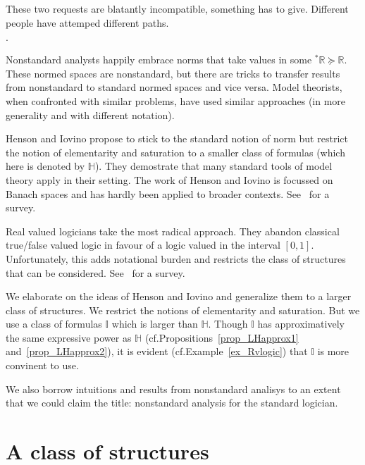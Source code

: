 \documentclass[10pt,oneside]{amsproc}
\newcommand{\mylabel}[1]{{#1}\hfill}
\renewenvironment{itemize}
  {\begin{list}{$\cdot$}{%
  \setlength{\parskip}{0mm}
  \setlength{\topsep}{.2\baselineskip}
  \setlength{\rightmargin}{0mm}
  \setlength{\listparindent}{0mm}
  \setlength{\itemindent}{0mm}
  \setlength{\labelwidth}{3ex}
  \setlength{\itemsep}{.2\baselineskip}
  \setlength{\parsep}{.2\baselineskip}
  \setlength{\partopsep}{0mm}
  \setlength{\labelsep}{1ex}
  \setlength{\leftmargin}{\labelwidth+\labelsep}
  \let\makelabel\mylabel}}{%
\end{list}}
\begin{document}
These two requests are blatantly incompatible, something has to give.
Different people have attemped different paths.
\begin{itemize}
  \item[1.] Nonstandard analysts happily embrace norms that take values in some ${}^*\mathds{R}\succeq\mathds{R}$.
  These normed spaces are nonstandard, but there are tricks to transfer results from nonstandard to standard normed spaces and vice versa.
  Model theorists, when confronted with similar problems, have used similar approaches (in more generality and with different notation).
  \item[2.] Henson and Iovino propose to stick to the standard notion of norm but restrict the notion of elementarity and saturation to a smaller class of formulas (which here is denoted by $\mathds{H}$).
  They demostrate that many standard tools of model theory apply in their setting. 
  The work of Henson and Iovino is focussed on Banach spaces and has hardly been applied to broader contexts. See~\cite{HI} for a survey.
  \item[3.] Real valued logicians take the most radical approach.
  They abandon classical true/false valued logic in favour of a logic valued in the interval $[0,1]$.
  Unfortunately, this adds notational burden and restricts the class of structures that can be considered. See~\cite{K} for a survey. 
\end{itemize}

We elaborate on the ideas of Henson and Iovino and generalize them to a larger class of structures.
We restrict the notions of elementarity and saturation.
But we use a class of formulas $\mathds{I}$ which is larger than $\mathds{H}$.
Though $\mathds{I}$ has approximatively the same expressive power as $\mathds{H}$ (cf.\@ Propositions~\ref{prop_LHapprox1} and~\ref{prop_LHapprox2}), it is evident (cf.\@ Example~\ref{ex_Rvlogic}) that $\mathds{I}$ is more convinent to use.

We also borrow intuitions and results from nonstandard analisys to an extent that we could claim the title: nonstandard analysis for the standard logician.


\section{A class of structures}\label{uno}
\end{document}
